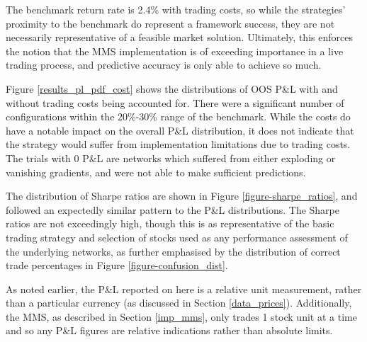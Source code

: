 \documentclass[a4paper,11pt,oneside]{article}
\theoremstyle{plain}
\theoremstyle{definition}
\begin{document}
	The benchmark return rate is 2.4\% with trading costs, so while the strategies' proximity to the benchmark do represent a framework success, they are not necessarily representative of a feasible market solution. Ultimately, this enforces the notion that the MMS implementation is of exceeding importance in a live trading process, and predictive accuracy is only able to achieve so much. \newline
	
	Figure \ref{results_pl_pdf_cost} shows the distributions of OOS P\&L with and without trading costs being accounted for. There were a significant number of configurations within the 20\%-30\% range of the benchmark. While the costs do have a notable impact on the overall P\&L distribution, it does not indicate that the strategy would suffer from implementation limitations due to trading costs. The trials with 0 P\&L are networks which suffered from either exploding or vanishing gradients, and were not able to make sufficient predictions.\newline 
	
	The distribution of Sharpe ratios are shown in Figure \ref{figure-sharpe_ratios}, and followed an expectedly similar pattern to the P\&L distributions. The Sharpe ratios are not exceedingly high, though this is as representative of the basic trading strategy and selection of stocks used as any performance assessment of the underlying networks, as further emphasised by the distribution of correct trade percentages in Figure \ref{figure-confusion_dist}. \newline 
	
	As noted earlier, the P\&L reported on here is a relative unit measurement, rather than a particular currency (as discussed in Section \ref{data_prices}). Additionally, the MMS, as described in Section \ref{imp_mms}, only trades 1 stock unit at a time and so any P\&L figures are relative indications rather than absolute limits.
	
\end{document}
